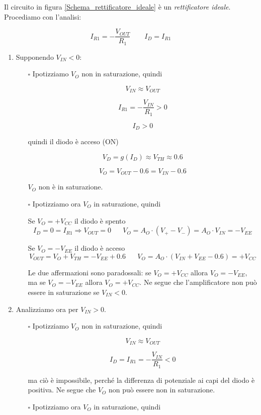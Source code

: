 \documentclass{article}
\begin{document}
Il circuito in figura \ref{Schema_rettificatore_ideale} è un \textit{rettificatore ideale}. Procediamo con l'analisi:

\[I_{R1} = -\frac{V_{OUT}}{R_1} \quad\quad I_D = I_{R1}\]
\begin{enumerate}
\item Supponendo $V_{IN} < 0$:
\begin{itemize}
  \item [$\square$] Ipotizziamo $V_O$ non in saturazione, quindi

\[V_{IN} \approx V_{OUT}\]

\[I_{R1} = -\frac{V_{IN}}{R_1} > 0\]

\[I_D > 0\]

quindi il diodo è acceso (ON)

\[V_D = g(I_D) \approx V_{TH} \approx 0.6\]

\[V_O = V_{OUT} - 0.6 = V_{IN} - 0.6\]

$V_O$ non è in saturazione.

\item [$\square$] Ipotizziamo ora $V_O$ in saturazione, quindi

\vspace{2mm}

Se $V_O = +V_{CC}$ il diodo è spento
\[ I_D = 0 = I_{R1} \Rightarrow V_{OUT} = 0 \;\;\;\;\;\; V_O = A_O \cdot (V_+ - V_-) = A_O \cdot V_{IN} = -V_{EE}\]

Se  $V_O = -V_{EE}$ il diodo è acceso
\[V_{OUT} = V_O + V_{TH} = -V_{EE} + 0.6 \;\;\;\;\;\; V_O = A_O \cdot (V_{IN} + V_{EE} - 0.6) = +V_{CC}\]

Le due affermazioni sono paradossali: se $V_O = +V_{CC}$ allora $V_O = -V_{EE}$, ma se $V_O = -V_{EE}$ allora $V_O = +V_{CC}$. Ne segue che l'amplificatore non può essere in saturazione se $V_{IN} < 0$.
\end{itemize}

\item Analizziamo ora per $V_{IN} > 0$.
\begin{itemize}
\item [$\square$] Ipotizziamo $V_O$ non in saturazione, quindi

\[V_{IN} \approx V_{OUT}\]

\[I_D = I_{R1} = - \frac{V_{IN}}{R_1} < 0\]

ma ciò è impossibile, perché la differenza di potenziale ai capi del diodo è positiva. Ne segue che $V_O$ non può essere non in saturazione.

\item [$\square$] Ipotizziamo ora $V_O$ in saturazione, quindi


\end{itemize}
\end{enumerate}
\end{document}
